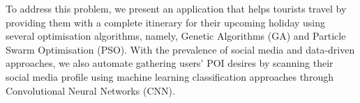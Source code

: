 
To address this problem, we present an application
that helps tourists travel by providing them with a
complete itinerary for their upcoming holiday using
several optimisation algorithms, namely, Genetic
Algorithms (GA) and Particle Swarm Optimisation (PSO).
With the prevalence of social media and data-driven
approaches, we also automate gathering users' POI
desires by scanning their social media profile using
machine learning classification approaches through
Convolutional Neural Networks (CNN).


